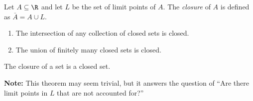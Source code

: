 \begin{definition}
    Let \(A \subseteq \R\) and let \(L\) be the set of limit points of \(A\). The \textit{closure} of \(A\) is defined as \(\bar{A} = A \cup L\).
\end{definition}

\begin{theorem}
    \begin{enumerate}[label=(\roman*)]
        \item The intersection of any collection of closed sets is closed. 
        \item The union of finitely many closed sets is closed.
    \end{enumerate}
\end{theorem}


\begin{theorem}
    The closure of a set is a closed set.
\end{theorem}

\textbf{Note:} This theorem may seem trivial, but it answers the question of ``Are there limit points in \(L\) that are not accounted for?''

